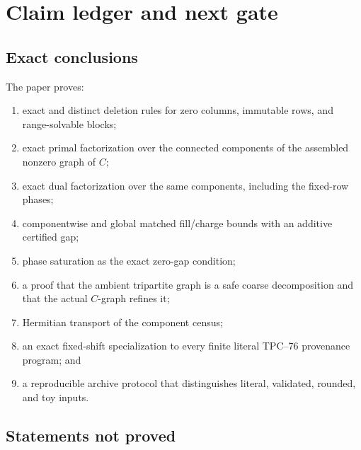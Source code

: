 \section{Claim ledger and next gate}
\label{sec:claim-boundary}

\subsection{Exact conclusions}

The paper proves:
\begin{enumerate}[label=\textup{(\arabic*)},leftmargin=2.8em]
 \item exact and distinct deletion rules for zero columns, immutable
       rows, and range-solvable blocks;
 \item exact primal factorization over the connected components of the
       assembled nonzero graph of \(C\);
 \item exact dual factorization over the same components, including the
       fixed-row phases;
 \item componentwise and global matched fill/charge bounds with an
       additive certified gap;
 \item phase saturation as the exact zero-gap condition;
 \item a proof that the ambient tripartite graph is a safe coarse
       decomposition and that the actual \(C\)-graph refines it;
 \item Hermitian transport of the component census;
 \item an exact fixed-shift specialization to every finite literal
       TPC--76 provenance program; and
 \item a reproducible archive protocol that distinguishes literal,
       validated, rounded, and toy inputs.
\end{enumerate}

\subsection{Statements not proved}

